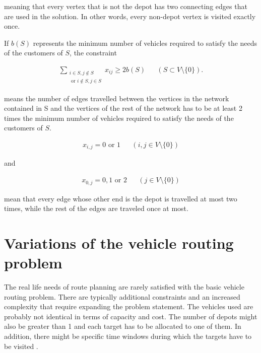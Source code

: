 \noindent
meaning that every vertex that is not the depot has two connecting edges that are used in the solution. In other words, every non-depot vertex is visited exactly once. \cite{laporte2007you}

\medskip
\noindent
If $b(S)$ represents the minimum number of vehicles required to satisfy the needs of the customers of $S$, the constraint

\begin{equation}
\begin{aligned}
\label{eq:baseformula4}
\displaystyle\sum_{\substack{i \in S, j \notin S \\ 
\text{ or } i \notin S, j \in S}} x_{ij} \geq 2b(S) && (S \subset V \setminus\{0\}).
\end{aligned}
\end{equation}

\noindent
means the number of edges travelled between the vertices in the network contained in S and the vertices of the rest of the network has to be at least 2 times the minimum number of vehicles required to satisfy the needs of the customers of $S$. \cite{laporte2007you}



\begin{equation}
\begin{aligned}
\label{eq:baseformula5}
x_{i,j} = 0 \text{ or } 1 && (i, j \in V\setminus\{0\})
\end{aligned}
\end{equation}

\noindent
and

\begin{equation}
\begin{aligned}
\label{eq:baseformula6}
x_{0,j} = 0, 1 \text{ or } 2 && (j \in V\setminus\{0\})
\end{aligned}
\end{equation}

\noindent
mean that every edge whose other end is the depot is travelled at most two times, while the rest of the edges are traveled once at most. \cite{laporte2007you}







\section{Variations of the vehicle routing problem}

The real life needs of route planning are rarely satisfied with the basic vehicle routing problem. There are typically additional constraints and an increased complexity that require expanding the problem statement. The vehicles used are probably not identical in terms of capacity and cost. The number of depots might also be greater than 1 and each target has to be allocated to one of them. \cite{salhi2014multi} In addition, there might be specific time windows during which the targets have to be visited \cite{ghoseiri2010multi}. 

